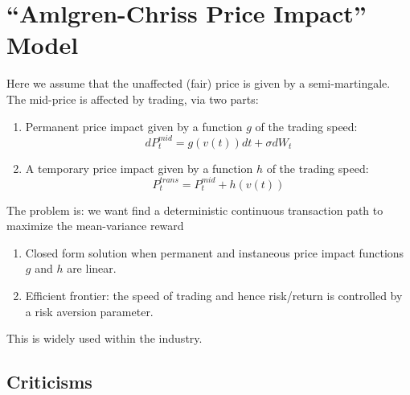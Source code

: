 \section{``Amlgren-Chriss Price Impact'' Model}
Here we assume that the unaffected (fair) price is given by a semi-martingale.
The mid-price is affected by trading, via two parts:
\begin{enumerate}
	\item Permanent price impact given by a function $g$ of the trading speed:
	\begin{equation}
		dP_t^{mid} = g(v(t))dt + \sigma dW_t
	\end{equation}
	
	\item A temporary price impact given by a function $h$ of the trading speed:
	\begin{equation}
		P^{trans}_t = P^{mid}_t + h(v(t))
	\end{equation}
\end{enumerate}

The problem is: we want find a deterministic continuous transaction path to maximize the mean-variance reward
\begin{enumerate}
	\item Closed form solution when permanent and instaneous price impact functions $g$ and $h$ are linear.
	\item Efficient frontier: the speed of trading and hence risk/return is controlled by a risk aversion parameter.
\end{enumerate}

This is widely used within the industry.

\subsection{Criticisms}